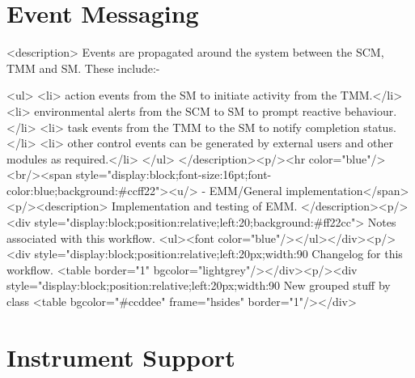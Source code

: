     \section{Event Messaging}

    <description>
      Events are propagated around the system between the SCM, TMM and SM. These include:-
      
      <ul>
	<li> action events from the SM to initiate activity from the TMM.</li>
	<li> environmental alerts from the SCM to SM to prompt reactive behaviour.</li>
	<li> task events from the TMM to the SM to notify completion status.</li>
	<li> other control events can be generated by external users and other modules as required.</li>
      </ul>
    </description><p/><hr color="blue"/><br/><span style="display:block;font-size:16pt;font-color:blue;background:#ccff22"><u/> -    EMM/General implementation</span><p/><description>
	Implementation and testing of EMM.
	</description><p/><div style="display:block;position:relative;left:20;background:#ff22cc">
      Notes associated with this workflow.
      <ul><font color="blue"/></ul></div><p/><div style="display:block;position:relative;left:20px;width:90%
      Changelog for this workflow.
      <table border="1" bgcolor="lightgrey"/></div><p/><div style="display:block;position:relative;left:20px;width:90%
     New grouped stuff by class
     <table bgcolor="#ccddee" frame="hsides" border="1"/></div>

    \section{Instrument Support}

